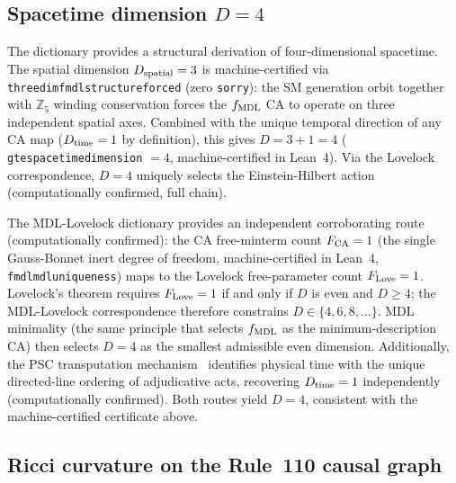 \documentclass[11pt]{article}
\theoremstyle{remark}
\newcommand{\Zfive}{\mathbb{Z}_5}
\newcommand{\fmdl}{f_{\rm MDL}}
\newcommand{\lean}[1]{%
  \penalty-100
  \begingroup\def\_{\textunderscore\allowbreak}\texttt{#1}\endgroup}
\begin{document}
\subsection{Spacetime dimension $D = 4$}

The dictionary provides a structural derivation of four-dimensional spacetime.
The spatial dimension $D_{\rm spatial} = 3$ is machine-certified via
\lean{three\_dim\_fmdl\_structure\_forced} (zero \texttt{sorry}): the SM generation orbit together
with $\Zfive$ winding conservation forces the $\fmdl$ CA to operate on three
independent spatial axes. Combined with the unique temporal direction of any CA map
($D_{\rm time} = 1$ by definition), this gives $D = 3 + 1 = 4$
(\lean{gte\_spacetime\_dimension} $= 4$, machine-certified in Lean~4).
Via the Lovelock correspondence, $D = 4$ uniquely selects the Einstein-Hilbert action
(computationally confirmed, full chain).

The MDL-Lovelock dictionary provides an independent corroborating route (computationally confirmed):
the CA free-minterm count $F_{\rm CA} = 1$ (the single Gauss-Bonnet inert degree of
freedom, machine-certified in Lean~4, \lean{fmdl\_mdl\_uniqueness}) maps to the Lovelock free-parameter
count $F_{\rm Love} = 1$. Lovelock's theorem requires $F_{\rm Love} = 1$ if and only if
$D$ is even and $D \geq 4$; the MDL-Lovelock correspondence therefore constrains
$D \in \{4,6,8,\ldots\}$. MDL minimality (the same principle that selects
$\fmdl$ as the minimum-description CA) then selects $D = 4$ as the smallest
admissible even dimension. Additionally, the PSC transputation
mechanism~\cite{SpivackGTEMobius} identifies physical time with the unique
directed-line ordering of adjudicative acts, recovering $D_{\rm time} = 1$
independently (computationally confirmed). Both routes yield $D = 4$, consistent with the
machine-certified certificate above.

\subsection{Ricci curvature on the Rule~110 causal graph}
\end{document}
